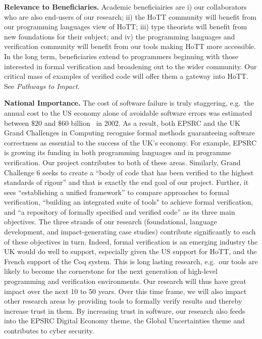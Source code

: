 \documentclass[a4paper,11pt]{article}
\newcommand{\eg}{{e.g.}\ }
\begin{document}
\vspace*{-0.1in}

{\bf Relevance to Beneficiaries.} Academic beneficiairies
are i) our collaborators who are also end-users of our research; ii)
the HoTT community will benefit from our programming languages
view of HoTT; iii) type theorists will benefit from new
foundations for their subject; and iv) the programming languages and
verification community will benefit from our tools making HoTT more
accessible. In the long term, beneficiaries extend to
programmers beginning with those interested in formal
verification and broadening out to the wider community. Our critical
mass of examples of verified code will offer them a gateway
into HoTT. See {\em Pathways to Impact}.
 

{\bf National Importance.} %
The cost of software failure is truly staggering, \eg the annual cost
to the US economy alone of avoidable software errors was estimated
between $\$ 20$ and $\$60$ billion~\cite{grandchallenges} in 2002.  As
a result, both EPSRC and the UK Grand Challenges in Computing
recognise formal methods guaranteeing software correctness as
essential to the success of the UK's economy. For example, EPSRC is
growing its funding in both programming languages and in programme
verification. Our project contributes to both of these
areas. Similarly, Grand Challenge 6 seeks to create a ``body of code
that has been verified to the highest standards of rigour'' and that
is exactly the end goal of our project. Further, it sees
``establishing a unified framework'' to compare approaches to formal
verification, ``building an integrated suite of tools" to achieve
formal verification, and ``a repository of formally specified and
verified code'' as its three main objectives. The three strands of our
research (foundational, language development, and impact-generating
case studies) contribute significantly to each of these objectives in
turn.  Indeed, formal verification is an emerging industry the UK
would do well to support, especially given the US support for HoTT,
and the French support of the Coq system. This is long lasting
research, \eg our tools are likely to become the cornerstone for the
next generation of high-level programming and verification
environments. Our research will thus have great impact over the next
10 to 50 years.  Over this time frame, we will also impact other
research areas by providing tools to formally verify results and
thereby increase trust in them. By increasing trust in software, our
research also feeds into the EPSRC Digital Economy theme, the Global
Uncertainties theme and contributes to cyber security.
\end{document}
